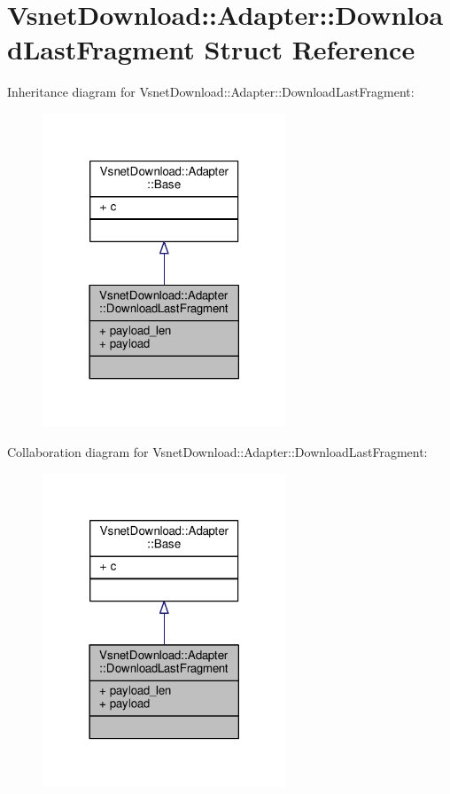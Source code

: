 \hypertarget{structVsnetDownload_1_1Adapter_1_1DownloadLastFragment}{}\section{Vsnet\+Download\+:\+:Adapter\+:\+:Download\+Last\+Fragment Struct Reference}
\label{structVsnetDownload_1_1Adapter_1_1DownloadLastFragment}


Inheritance diagram for Vsnet\+Download\+:\+:Adapter\+:\+:Download\+Last\+Fragment\+:
\nopagebreak
\begin{figure}[H]
\begin{center}
\leavevmode
\includegraphics[width=206pt]{d3/d15/structVsnetDownload_1_1Adapter_1_1DownloadLastFragment__inherit__graph}
\end{center}
\end{figure}


Collaboration diagram for Vsnet\+Download\+:\+:Adapter\+:\+:Download\+Last\+Fragment\+:
\nopagebreak
\begin{figure}[H]
\begin{center}
\leavevmode
\includegraphics[width=206pt]{dd/d9c/structVsnetDownload_1_1Adapter_1_1DownloadLastFragment__coll__graph}
\end{center}
\end{figure}

